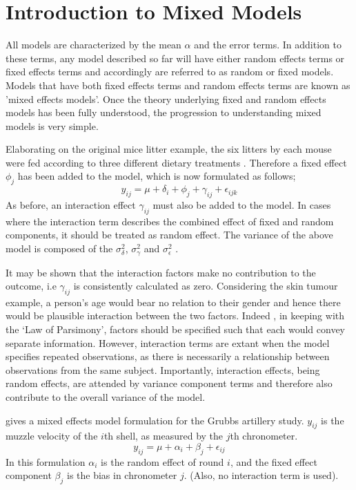 \documentclass[12pt, a4paper]{report}
\theoremstyle{plain}
\theoremstyle{definition}
\theoremstyle{remark}
\begin{document}
\section{Introduction to Mixed Models}


All models are characterized by the mean $\alpha$ and the error
terms. In addition to these terms, any model described so far will
have either random effects terms or fixed effects terms and
accordingly are referred to as random or fixed models. Models that
have both fixed effects terms and random effects terms are known
as 'mixed effects models'. Once the theory underlying fixed and
random effects models has been fully understood, the progression
to understanding mixed models is very simple.

Elaborating on the original mice litter example, the six litters
by each mouse were fed according to three different dietary
treatments \citep{Searle}. Therefore a fixed effect $\phi_{j}$ has
been added to the model, which is now formulated as follows;
\begin{equation}
y_{ij} = \mu + \delta_{i} + \phi_{j} + \gamma_{ij} +
\epsilon_{ijk}
\end{equation}
As before, an interaction effect $\gamma_{ij}$ must also be added
to the model. In cases where the interaction term describes the
combined effect of fixed and random components, it should be
treated as random effect. The variance of the above model is
composed of the $\sigma^{2}_{\delta}$, $\sigma^{2}_{\gamma}$ and
$\sigma^{2}_{\epsilon}$ .


It may be shown that the interaction factors make no contribution
to the outcome, i.e $\gamma_{ij}$ is consistently calculated as
zero. Considering the skin tumour example, a person's age would
bear no relation to their gender and hence there would be
plausible interaction between the two factors. Indeed , in keeping
with the `Law of Parsimony', factors should be specified such that
each would convey separate information. However, interaction terms
are extant when the model specifies repeated observations, as
there is necessarily a relationship between observations from the
same subject. Importantly, interaction effects, being random
effects, are attended by variance component terms and therefore
also contribute to the overall variance of the model.

\citet{Searle} gives a mixed effects model formulation for the
Grubbs artillery study. $y_{ij}$ is the muzzle velocity of the
$i$th shell, as measured by the $j$th chronometer.
\begin{equation}
y_{ij} = \mu + \alpha_{i} + \beta_{j}  + \epsilon_{ij}
\end{equation}
In this formulation $\alpha_{i}$ is the random effect of round
$i$, and the fixed effect component $\beta_{j}$ is the bias in
chronometer $j$. (Also, no interaction term is used).
\end{document}
